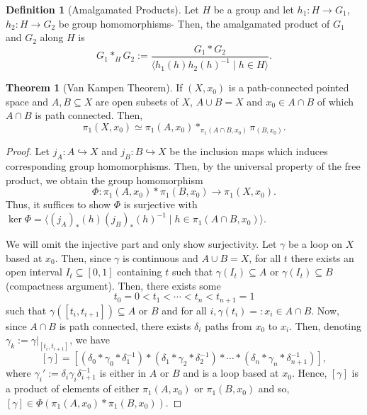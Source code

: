 \documentclass[]{article}
\theoremstyle{definition}
\newtheorem{theorem}{Theorem}
\theoremstyle{definition}
\newtheorem{definition}{Definition}[section]
\begin{document}
\begin{definition}[Amalgamated Products]
  Let \(H\) be a group and let \(h_1 : H \to G_1\), \(h_2 : H \to G_2\) be 
  group homomorphisms- Then, the amalgamated product of \(G_1\) and \(G_2\) 
  along \(H\) is 
  \[G_1 *_H G_2 := 
    \frac{G_1 * G_2}{\langle h_1(h) h_2(h)^{-1} \mid h \in H\rangle}.\]
\end{definition}

\begin{theorem}[Van Kampen Theorem]
  If \((X, x_0)\) is a path-connected pointed space and \(A, B \subseteq X\) are 
  open subsets of \(X\), \(A \cup B = X\) and \(x_0 \in A \cap B\) of which 
  \(A \cap B\) is path connected. Then, 
  \[\pi_1(X, x_0) \simeq \pi_1(A, x_0) *_{\pi_1(A \cap B, x_0)} \pi_(B, x_0).\]
\end{theorem}
\begin{proof}
  Let \(j_A : A \hookrightarrow X\) and \(j_B : B \hookrightarrow X\) be the 
  inclusion maps which induces corresponding group homomorphisms. Then, 
  by the universal property of the free product, we obtain the group homomorphism 
  \[\Phi : \pi_1(A, x_0) * \pi_1(B, x_0) \to \pi_1(X, x_0).\]
  Thus, it suffices to show \(\Phi\) is surjective with \(\ker \Phi = 
  \langle (j_A)_*(h) (j_B)_*(h)^{-1} \mid h \in \pi_1(A \cap B, x_0) \rangle\).

  We will omit the injective part and only show surjectivity. Let \(\gamma\) be 
  a loop on \(X\) based at \(x_0\). Then, since \(\gamma\) is continuous 
  and \(A \cup B = X\), for all \(t\) there exists an open interval \(I_t \subseteq [0, 1]\) 
  containing \(t\) such that \(\gamma(I_t) \subseteq A\) or 
  \(\gamma(I_t) \subseteq B\) (compactness argument). Then, there exists 
  some 
  \[t_0 = 0 < t_1 < \cdots < t_n < t_{n + 1} = 1\]
  such that \(\gamma([t_i, t_{i + 1}]) \subseteq A\) or \(B\) and for all 
  \(i, \gamma(t_i) =: x_i \in A \cap B\). Now, since \(A \cap B\) is path 
  connected, there exists \(\delta_i\) paths from \(x_0\) to \(x_i\). Then, 
  denoting \(\gamma_k := \gamma|_{[t_i, t_{i + 1}]}\), we have 
  \[[\gamma] = 
    [(\delta_0 * \gamma_0 * \delta_1^{-1}) 
    * (\delta_1 * \gamma_2 * \delta_2^{-1})
    * \cdots * (\delta_n * \gamma_n * \delta_{n + 1}^{-1})],\]
  where \(\gamma_i' := \delta_i \gamma_i \delta_{i + 1}^{-1}\) 
  is either in \(A\) or \(B\) and is a loop based at \(x_0\). Hence, 
  \([\gamma]\) is a product of elements of either 
  \(\pi_1(A, x_0)\) or \(\pi_1(B, x_0)\) and so, 
  \([\gamma] \in \Phi(\pi_1(A, x_0) * \pi_1(B, x_0))\).
\end{proof}
\end{document}
